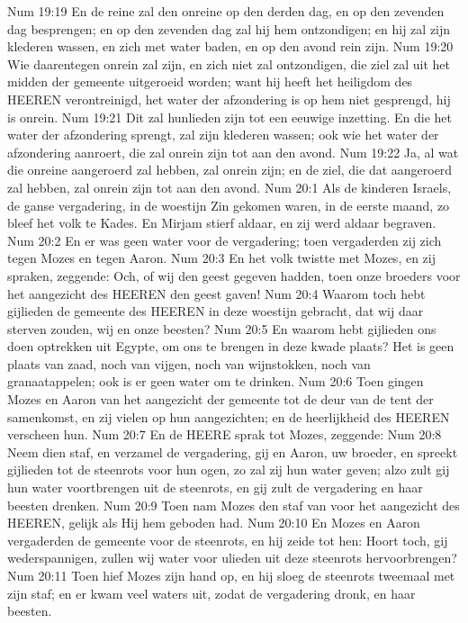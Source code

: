 Num 19:19  En de reine zal den onreine op den derden dag, en op den zevenden dag besprengen; en op den zevenden dag zal hij hem ontzondigen; en hij zal zijn klederen wassen, en zich met water baden, en op den avond rein zijn.
Num 19:20  Wie daarentegen onrein zal zijn, en zich niet zal ontzondigen, die ziel zal uit het midden der gemeente uitgeroeid worden; want hij heeft het heiligdom des HEEREN verontreinigd, het water der afzondering is op hem niet gesprengd, hij is onrein.
Num 19:21  Dit zal hunlieden zijn tot een eeuwige inzetting. En die het water der afzondering sprengt, zal zijn klederen wassen; ook wie het water der afzondering aanroert, die zal onrein zijn tot aan den avond.
Num 19:22  Ja, al wat die onreine aangeroerd zal hebben, zal onrein zijn; en de ziel, die dat aangeroerd zal hebben, zal onrein zijn tot aan den avond.
Num 20:1  Als de kinderen Israels, de ganse vergadering, in de woestijn Zin gekomen waren, in de eerste maand, zo bleef het volk te Kades. En Mirjam stierf aldaar, en zij werd aldaar begraven.
Num 20:2  En er was geen water voor de vergadering; toen vergaderden zij zich tegen Mozes en tegen Aaron.
Num 20:3  En het volk twistte met Mozes, en zij spraken, zeggende: Och, of wij den geest gegeven hadden, toen onze broeders voor het aangezicht des HEEREN den geest gaven!
Num 20:4  Waarom toch hebt gijlieden de gemeente des HEEREN in deze woestijn gebracht, dat wij daar sterven zouden, wij en onze beesten?
Num 20:5  En waarom hebt gijlieden ons doen optrekken uit Egypte, om ons te brengen in deze kwade plaats? Het is geen plaats van zaad, noch van vijgen, noch van wijnstokken, noch van granaatappelen; ook is er geen water om te drinken.
Num 20:6  Toen gingen Mozes en Aaron van het aangezicht der gemeente tot de deur van de tent der samenkomst, en zij vielen op hun aangezichten; en de heerlijkheid des HEEREN verscheen hun.
Num 20:7  En de HEERE sprak tot Mozes, zeggende:
Num 20:8  Neem dien staf, en verzamel de vergadering, gij en Aaron, uw broeder, en spreekt gijlieden tot de steenrots voor hun ogen, zo zal zij hun water geven; alzo zult gij hun water voortbrengen uit de steenrots, en gij zult de vergadering en haar beesten drenken.
Num 20:9  Toen nam Mozes den staf van voor het aangezicht des HEEREN, gelijk als Hij hem geboden had.
Num 20:10  En Mozes en Aaron vergaderden de gemeente voor de steenrots, en hij zeide tot hen: Hoort toch, gij wederspannigen, zullen wij water voor ulieden uit deze steenrots hervoorbrengen?
Num 20:11  Toen hief Mozes zijn hand op, en hij sloeg de steenrots tweemaal met zijn staf; en er kwam veel waters uit, zodat de vergadering dronk, en haar beesten.
